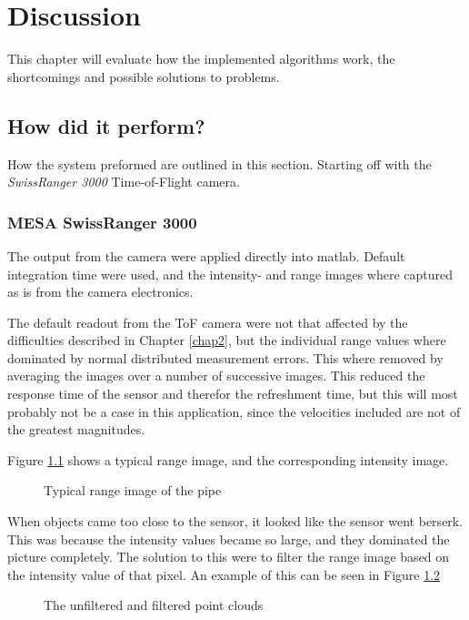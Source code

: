 
\chapter{Discussion}
\label{chap8}
This chapter will evaluate how the implemented algorithms work, the shortcomings and
possible solutions to problems. 

\section{How did it perform?}
How the system preformed are outlined in this section. Starting off with the
\emph{SwissRanger 3000} Time-of-Flight camera.

\subsection{MESA SwissRanger 3000}
The output from the camera were applied directly into matlab. Default
integration time were used, and the intensity- and range images where captured as is from
the camera electronics.

The default readout from the ToF camera were not that affected by the difficulties
described in Chapter \ref{chap2}, but the individual range values where dominated by normal
distributed measurement errors. This where removed by averaging the images over a number
of successive images. This reduced the response time of the sensor and therefor the
refreshment time, but this will most probably not be a case in this application, since the
velocities included are not of the greatest magnitudes. 

Figure \ref{chap8:fig-typical-tof-image} shows a typical range image, and the
corresponding intensity image. 
\begin{figure}[htbp]
    \centering
    \caption{Typical range image of the pipe}
    \label{chap8:fig-typical-tof-image}
\end{figure}

When objects came too close to the sensor, it looked like the sensor went berserk. This
was because the intensity values became so large, and they dominated the picture
completely. The solution to this were to filter the range image based on the intensity
value of that pixel. An example of this can be seen in Figure
\ref{chap8:fig-tof-imagery-intensity-filtered}
\begin{figure}[htbp]
    \centering
    \caption{The unfiltered and filtered point clouds}
    \label{chap8:fig-tof-imagery-intensity-filtered}
\end{figure}

